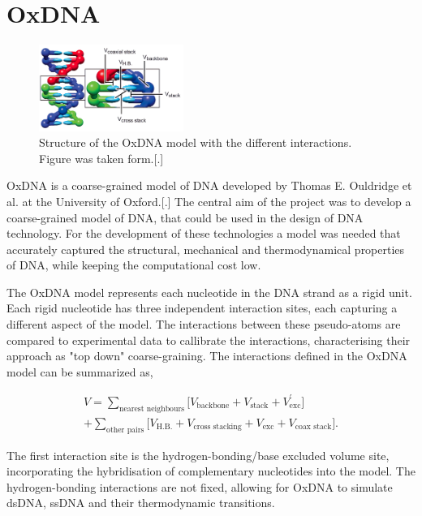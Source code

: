 \section{OxDNA}

\begin{figure}
  \begin{center}
    \includegraphics[width=0.42\textwidth]{Figures/oxDNA_model.png}
  \end{center}
  \caption{Structure of the OxDNA model with the different interactions.
  Figure was taken form.[.]}
\end{figure}

OxDNA is a coarse-grained model of DNA developed by Thomas E. Ouldridge et al. at the
University of Oxford.[.] The central aim of the project was to develop a coarse-grained
model of DNA, that could be used in the design of DNA technology. For the development of
these technologies a model was needed that accurately captured the structural, mechanical
and thermodynamical properties of DNA, while keeping the computational cost low.

The OxDNA model represents each nucleotide in the DNA strand as a rigid unit. Each rigid
nucleotide has three independent interaction sites, each capturing a different aspect of
the model. The interactions between these pseudo-atoms are compared to experimental
data to callibrate the interactions, characterising their approach as "top down"
coarse-graining. The interactions defined in the OxDNA model can be summarized as,

\begin{equation}
  \begin{aligned}
    V = \sum_{\text{nearest neighbours}} \bigg[ V_{\text{backbone}} + V_{\text{stack}} +
    V^{'}_{\text{exc}}\bigg]\\
    + \sum_{\text{other pairs}} \bigg[V_{\text{H.B.}} + V_{\text{cross stacking}} +
    V_{\text{exc}} + V_{\text{coax stack}}\bigg].
  \end{aligned}
\end{equation}

The first interaction site is the hydrogen-bonding/base excluded volume site,
incorporating the hybridisation of complementary nucleotides into the model. The
hydrogen-bonding interactions are not fixed, allowing for OxDNA to simulate dsDNA, ssDNA
and their thermodynamic transitions.

